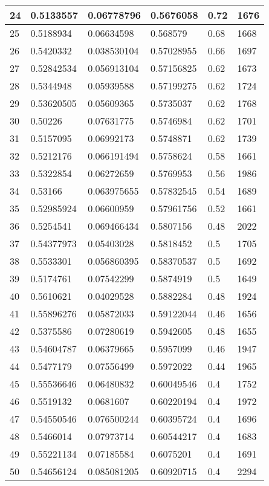 \begin{longtable}{|l|l|l|l|l|l|}
24 & 0.5133557 & 0.06778796 & 0.5676058 & 0.72 & 1676 \\ \hline 
25 & 0.5188934 & 0.06634598 & 0.568579 & 0.68 & 1668 \\ \hline 
26 & 0.5420332 & 0.038530104 & 0.57028955 & 0.66 & 1697 \\ \hline 
27 & 0.52842534 & 0.056913104 & 0.57156825 & 0.62 & 1673 \\ \hline 
28 & 0.5344948 & 0.05939588 & 0.57199275 & 0.62 & 1724 \\ \hline 
29 & 0.53620505 & 0.05609365 & 0.5735037 & 0.62 & 1768 \\ \hline 
30 & 0.50226 & 0.07631775 & 0.5746984 & 0.62 & 1701 \\ \hline 
31 & 0.5157095 & 0.06992173 & 0.5748871 & 0.62 & 1739 \\ \hline 
32 & 0.5212176 & 0.066191494 & 0.5758624 & 0.58 & 1661 \\ \hline 
33 & 0.5322854 & 0.06272659 & 0.5769953 & 0.56 & 1986 \\ \hline 
34 & 0.53166 & 0.063975655 & 0.57832545 & 0.54 & 1689 \\ \hline 
35 & 0.52985924 & 0.06600959 & 0.57961756 & 0.52 & 1661 \\ \hline 
36 & 0.5254541 & 0.069466434 & 0.5807156 & 0.48 & 2022 \\ \hline 
37 & 0.54377973 & 0.05403028 & 0.5818452 & 0.5 & 1705 \\ \hline 
38 & 0.5533301 & 0.056860395 & 0.58370537 & 0.5 & 1692 \\ \hline 
39 & 0.5174761 & 0.07542299 & 0.5874919 & 0.5 & 1649 \\ \hline 
40 & 0.5610621 & 0.04029528 & 0.5882284 & 0.48 & 1924 \\ \hline 
41 & 0.55896276 & 0.05872033 & 0.59122044 & 0.46 & 1656 \\ \hline 
42 & 0.5375586 & 0.07280619 & 0.5942605 & 0.48 & 1655 \\ \hline 
43 & 0.54604787 & 0.06379665 & 0.5957099 & 0.46 & 1947 \\ \hline 
44 & 0.5477179 & 0.07556499 & 0.5972022 & 0.44 & 1965 \\ \hline 
45 & 0.55536646 & 0.06480832 & 0.60049546 & 0.4 & 1752 \\ \hline 
46 & 0.5519132 & 0.0681607 & 0.60220194 & 0.4 & 1972 \\ \hline 
47 & 0.54550546 & 0.076500244 & 0.60395724 & 0.4 & 1696 \\ \hline 
48 & 0.5466014 & 0.07973714 & 0.60544217 & 0.4 & 1683 \\ \hline 
49 & 0.55221134 & 0.07185584 & 0.6075201 & 0.4 & 1691 \\ \hline 
50 & 0.54656124 & 0.085081205 & 0.60920715 & 0.4 & 2294 \\ \hline 
\end{longtable}